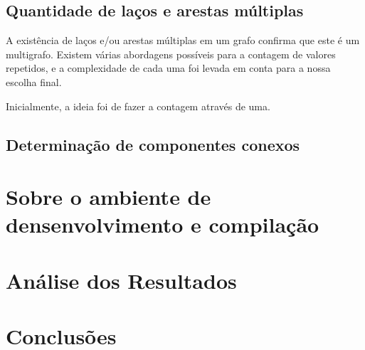 \documentclass[a4paper, 12pt]{article}
\begin{document}
\subsection{Quantidade de laços e arestas múltiplas}

A existência de laços e/ou arestas múltiplas em um grafo confirma que este é um
multigrafo. Existem várias abordagens possíveis para a contagem de valores repetidos,
e a complexidade de cada uma foi levada em conta para a nossa escolha final.

Inicialmente, a ideia foi de fazer a contagem através de uma.

\subsection{Determinação de componentes conexos}
\newpage

\section{Sobre o ambiente de densenvolvimento e compilação}

\newpage
\section{Análise dos Resultados}
\newpage

\section{Conclusões}
\end{document}
